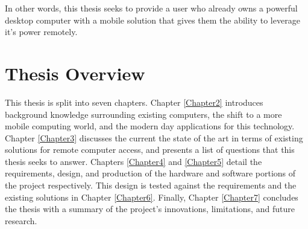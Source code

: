 In other words, this thesis seeks to provide a user who already owns a powerful desktop computer with a mobile solution that gives them the ability to leverage it's power remotely.


\section{Thesis Overview}

This thesis is split into seven chapters.
Chapter \ref{Chapter2} introduces background knowledge surrounding existing computers, the shift to a more mobile computing world, and the modern day applications for this technology.
Chapter \ref{Chapter3} discusses the current the state of the art in terms of existing solutions for remote computer access, and presents a list of questions that this thesis seeks to answer.
Chapters \ref{Chapter4} and \ref{Chapter5} detail the requirements, design, and production of the hardware and software portions of the project respectively.
This design is tested against the requirements and the existing solutions in Chapter \ref{Chapter6}.
Finally, Chapter \ref{Chapter7} concludes the thesis with a summary of the project's innovations, limitations, and future research.